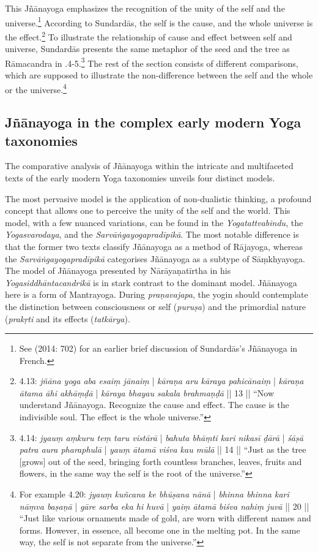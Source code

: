 This Jñānayoga emphasizes the recognition of the unity of the self and the universe.\footnote{See \citeauthor{burger2014sarvangayogapradipika} (2014: 702) for an earlier brief discussion of Sundardās's Jñānayoga in French.} According to Sundardās, the self is the cause, and the whole universe is the effect.\footnote{ 4.13: \textit{jñāna yoga aba esaiṃ jānaiṃ} | \textit{kāraṇa aru kāraya pahicānaiṃ} | \textit{kāraṇa ātama āhi akhāṃḍā} | \textit{kāraya bhayau sakala brahmaṇḍā} || 13 || ``Now understand Jñānayoga. Recognize the cause and effect. The cause is the indivisible soul. The effect is the whole universe.''} To illustrate the relationship of cause and effect between self and universe, Sundardās presents the same metaphor of the seed and the tree as Rāmacandra in .4-5.\footnote{ 4.14: \textit{jyauṃ aṃkuru teṃ taru vistārā} | \textit{bahuta bhāṃti kari nikasī ḍārā} | \textit{śāṣā patra aura pharaphulā} | \textit{yauṃ ātamā viśva kau mūlā} || 14 || ``Just as the tree [grows] out of the seed, bringing forth countless branches, leaves, fruits and flowers, in the same way the self is the root of the universe.''} The rest of the section consists of different comparisons, which are supposed to illustrate the non-difference between the self and the whole or the universe.\footnote{For example  4.20: \textit{jyauṃ kuñcana ke bhūṣana nānā} | \textit{bhinna bhinna kari nāṃva baṣaṇā} | \textit{gāre sarba eka hi huvā} | \textit{yaiṃ ātamā biśva nahiṃ juvā} || 20 || ``Just like various ornaments made of gold, are worn with different names and forms. However, in essence, all become one in the melting pot. In the same way, the self is not separate from the universe.''} 

\subsection{Jñānayoga in the complex early modern Yoga taxonomies}

The comparative analysis of Jñānayoga within the intricate and multifaceted texts of the early modern Yoga taxonomies unveils four distinct models.  

The most pervasive model is the application of non-dualistic thinking, a profound concept that allows one to perceive the unity of the self and the world. This model, with a few nuanced variations, can be found in the \textit{Yogatattvabindu}, the \textit{Yogasvarodaya}, and the \textit{Sarvāṅgayogapradīpikā}. The most notable difference is that the former two texts classify Jñānayoga as a method of Rājayoga, whereas the \textit{Sarvāṅgayogapradīpikā} categorises Jñānayoga as a subtype of Sāṃkhyayoga. 
The model of Jñānayoga presented by Nārāyaṇatīrtha in his \textit{Yogasiddhāntacandrikā} is in stark contrast to the dominant model. Jñānayoga here is a form of Mantrayoga. During \textit{praṇavajapa}, the yogin should contemplate the distinction between consciousness or self (\textit{puruṣa}) and the primordial nature (\textit{prakṛti} and its effects (\textit{tatkārya}).    

